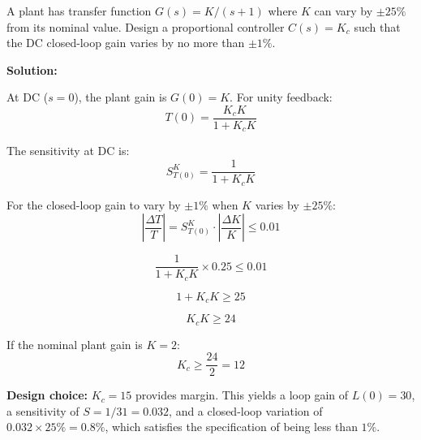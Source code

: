 \begin{example}
\label{ex:design_sensitivity}
A plant has transfer function $G(s) = K/(s+1)$ where $K$ can vary by $\pm 25\%$ from its nominal value. Design a proportional controller $C(s) = K_c$ such that the DC closed-loop gain varies by no more than $\pm 1\%$.

\textbf{Solution:}

At DC ($s = 0$), the plant gain is $G(0) = K$. For unity feedback:
\begin{equation}
T(0) = \frac{K_c K}{1 + K_c K}
\end{equation}

The sensitivity at DC is:
\begin{equation}
S^K_{T(0)} = \frac{1}{1 + K_c K}
\end{equation}

For the closed-loop gain to vary by $\pm 1\%$ when $K$ varies by $\pm 25\%$:
\begin{equation}
\left|\frac{\Delta T}{T}\right| = S^K_{T(0)} \cdot \left|\frac{\Delta K}{K}\right| \leq 0.01
\end{equation}

\begin{equation}
\frac{1}{1 + K_c K} \times 0.25 \leq 0.01
\end{equation}

\begin{equation}
1 + K_c K \geq 25
\end{equation}

\begin{equation}
K_c K \geq 24
\end{equation}

If the nominal plant gain is $K = 2$:
\begin{equation}
K_c \geq \frac{24}{2} = 12
\end{equation}

\textbf{Design choice:} $K_c = 15$ provides margin. This yields a loop gain of $L(0) = 30$, a sensitivity of $S = 1/31 = 0.032$, and a closed-loop variation of $0.032 \times 25\% = 0.8\%$, which satisfies the specification of being less than $1\%$.
\end{example}

